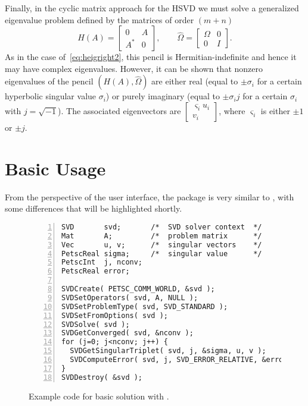 Finally, in the cyclic matrix approach for the HSVD we must solve a generalized eigenvalue problem defined by the matrices of order $(m+n)$
\begin{equation}
\label{eq:hcyclic}
H(A)=\begin{bmatrix}0&A\\A^*&0\end{bmatrix},\qquad
\hat\Omega=\begin{bmatrix}\Omega&0\\0&I\end{bmatrix}.
\end{equation}
As in the case of~\eqref{eq:heigright2}, this pencil is Hermitian-indefinite and hence it may have complex eigenvalues. However, it can be shown that nonzero eigenvalues of the pencil $(H(A),\hat\Omega)$ are either real (equal to $\pm\sigma_i$ for a certain hyperbolic singular value $\sigma_i$) or purely imaginary (equal to $\pm\sigma_ij$ for a certain $\sigma_i$ with $j=\sqrt{-1}$). The associated eigenvectors are $\left[\begin{smallmatrix}\varsigma_i u_i\\v_i\end{smallmatrix}\right]$, where $\varsigma_i$ is either $\pm 1$ or $\pm j$.

\section{Basic Usage}

From the perspective of the user interface, the  package is very similar to , with some differences that will be highlighted shortly.

\begin{figure}
\begin{Verbatim}[fontsize=\small,numbers=left,numbersep=6pt,xleftmargin=15mm]
SVD       svd;       /*  SVD solver context  */
Mat       A;         /*  problem matrix      */
Vec       u, v;      /*  singular vectors    */
PetscReal sigma;     /*  singular value      */
PetscInt  j, nconv;
PetscReal error;

SVDCreate( PETSC_COMM_WORLD, &svd );
SVDSetOperators( svd, A, NULL );
SVDSetProblemType( svd, SVD_STANDARD );
SVDSetFromOptions( svd );
SVDSolve( svd );
SVDGetConverged( svd, &nconv );
for (j=0; j<nconv; j++) {
  SVDGetSingularTriplet( svd, j, &sigma, u, v );
  SVDComputeError( svd, j, SVD_ERROR_RELATIVE, &error );
}
SVDDestroy( &svd );
\end{Verbatim}
\caption{\label{fig:ex-svd}Example code for basic solution with .}
\end{figure}

